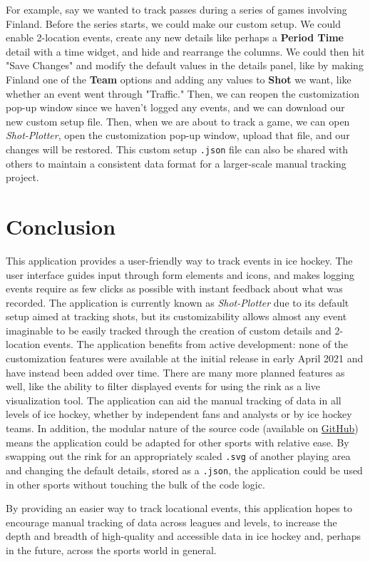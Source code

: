 \documentclass[letterpaper]{article}
\begin{document}
For example, say we wanted to track passes during a series of games involving Finland. Before the series starts, we could make our custom setup. We could enable 2-location events, create any new details like perhaps a \textbf{Period Time} detail with a time widget, and hide and rearrange the columns. We could then hit "Save Changes" and modify the default values in the details panel, like by making Finland one of the \textbf{Team} options and adding any values to \textbf{Shot} we want, like whether an event went through "Traffic." Then, we can reopen the customization pop-up window since we haven't logged any events, and we can download our new custom setup file. Then, when we are about to track a game, we can open \textit{Shot-Plotter}, open the customization pop-up window, upload that file, and our changes will be restored. This custom setup \texttt{.json} file can also be shared with others to maintain a consistent data format for a larger-scale manual tracking project.

\section{Conclusion}
This application provides a user-friendly way to track events in ice hockey. The user interface guides input through form elements and icons, and makes logging events require as few clicks as possible with instant feedback about what was recorded. The application is currently known as \textit{Shot-Plotter} due to its default setup aimed at tracking shots, but its customizability allows almost any event imaginable to be easily tracked through the creation of custom details and 2-location events. The application benefits from active development: none of the customization features were available at the initial release in early April 2021 and have instead been added over time. There are many more planned features as well, like the ability to filter displayed events for using the rink as a live visualization tool. The application can aid the manual tracking of data in all levels of ice hockey, whether by independent fans and analysts or by ice hockey teams. In addition, the modular nature of the source code (available on \href{https://github.com/nguyenank/shot-plotter}{GitHub}) means the application could be adapted for other sports with relative ease. By swapping out the rink for an appropriately scaled \texttt{.svg} of another playing area and changing the default details, stored as a \texttt{.json}, the application could be used in other sports without touching the bulk of the code logic. 

By providing an easier way to track locational events, this application hopes to encourage manual tracking of data across leagues and levels, to increase the depth and breadth of high-quality and accessible data in ice hockey and, perhaps in the future, across the sports world in general.


\printbibliography
\end{document}
